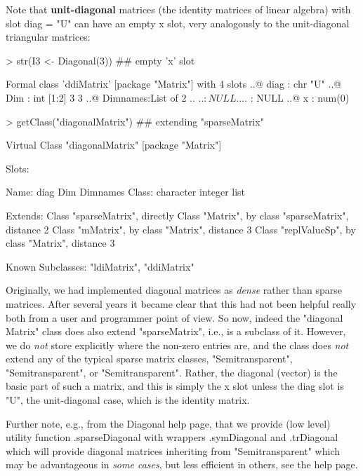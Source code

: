 \documentclass{article}
\begin{document}
{Note that \textbf{unit-diagonal} matrices (the identity matrices of linear algebra)
with slot diag = "U" can have an empty x slot, very
analogously to the unit-diagonal triangular matrices:
\begin{Schunk}
\begin{Sinput}
> str(I3 <- Diagonal(3)) ## empty 'x' slot
\end{Sinput}
\begin{Soutput}
Formal class 'ddiMatrix' [package "Matrix"] with 4 slots
  ..@ diag    : chr "U"
  ..@ Dim     : int [1:2] 3 3
  ..@ Dimnames:List of 2
  .. ..$ : NULL
  .. ..$ : NULL
  ..@ x       : num(0) 
\end{Soutput}
\begin{Sinput}
> getClass("diagonalMatrix") ## extending "sparseMatrix"
\end{Sinput}
\begin{Soutput}
Virtual Class "diagonalMatrix" [package "Matrix"]

Slots:
                                    
Name:       diag       Dim  Dimnames
Class: character   integer      list

Extends: 
Class "sparseMatrix", directly
Class "Matrix", by class "sparseMatrix", distance 2
Class "mMatrix", by class "Matrix", distance 3
Class "replValueSp", by class "Matrix", distance 3

Known Subclasses: "ldiMatrix", "ddiMatrix"
\end{Soutput}
\end{Schunk}
Originally, we had implemented diagonal matrices as \emph{dense} rather than sparse
matrices.  After several years it became clear that this had not been
helpful really both from a user and programmer point of view.
So now, indeed the "diagonal Matrix" class does also extend
"sparseMatrix", i.e., is a subclass of it.
However, we do \emph{not} store explicitly
where the non-zero entries are, and the class does \emph{not} extend any of
the typical sparse matrix classes, "Semitransparent",
"Semitransparent", or "Semitransparent".
Rather, the diagonal (vector) is the basic part of such a matrix,
and this is simply the x slot unless the diag slot is "U",
the unit-diagonal case, which is the identity matrix.

Further note, e.g., from the Diagonal help page, that we provide
(low level) utility function
.sparseDiagonal with wrappers
.symDiagonal and .trDiagonal which will provide diagonal
matrices inheriting from "Semitransparent" which may be advantageous
in \emph{some cases}, but less efficient in others, see the help page.


}
\end{document}
